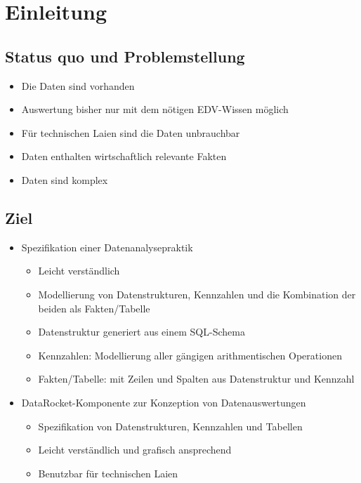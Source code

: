 \chapter{Einleitung}

\section{Status quo und Problemstellung}
\begin{itemize}
  \item Die Daten sind vorhanden
  \item Auswertung bisher nur mit dem nötigen EDV-Wissen möglich
  \item Für technischen Laien sind die Daten unbrauchbar
  \item Daten enthalten wirtschaftlich relevante Fakten
  \item Daten sind komplex
\end{itemize}

\section{Ziel}
\begin{itemize}
\item Spezifikation einer Datenanalysepraktik
  \begin{itemize}
    \item Leicht verständlich
    \item Modellierung von Datenstrukturen, Kennzahlen und die Kombination der beiden als Fakten/Tabelle
    \item Datenstruktur generiert aus einem SQL-Schema
    \item Kennzahlen: Modellierung aller gängigen arithmentischen Operationen
    \item Fakten/Tabelle: mit Zeilen und Spalten aus Datenstruktur und Kennzahl 
  \end{itemize}
\item DataRocket-Komponente zur Konzeption von Datenauswertungen
  \begin{itemize}
    \item Spezifikation von Datenstrukturen, Kennzahlen und Tabellen
    \item Leicht verständlich und grafisch ansprechend
    \item Benutzbar für technischen Laien
  \end{itemize}
\end{itemize}
